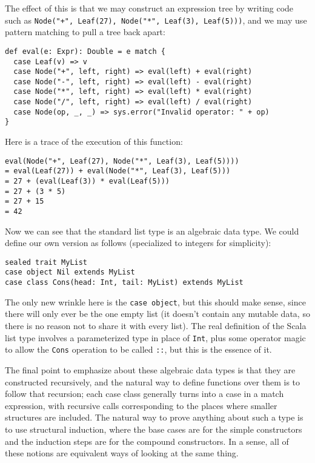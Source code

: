 The effect of this is that we may construct an expression tree by writing code such as \texttt{Node("+", Leaf(27), Node("*", Leaf(3), Leaf(5)))}, and we may use pattern matching to pull a tree back apart:
\begin{verbatim}
def eval(e: Expr): Double = e match {
  case Leaf(v) => v
  case Node("+", left, right) => eval(left) + eval(right)
  case Node("-", left, right) => eval(left) - eval(right)
  case Node("*", left, right) => eval(left) * eval(right)
  case Node("/", left, right) => eval(left) / eval(right)
  case Node(op, _, _) => sys.error("Invalid operator: " + op)
}
\end{verbatim}
Here is a trace of the execution of this function:
\begin{verbatim}
eval(Node("+", Leaf(27), Node("*", Leaf(3), Leaf(5))))
= eval(Leaf(27)) + eval(Node("*", Leaf(3), Leaf(5)))
= 27 + (eval(Leaf(3)) * eval(Leaf(5)))
= 27 + (3 * 5)
= 27 + 15
= 42
\end{verbatim}

Now we can see that the standard list type is an algebraic data type. We could define our own version as follows (specialized to integers for simplicity):
\begin{verbatim}
sealed trait MyList
case object Nil extends MyList
case class Cons(head: Int, tail: MyList) extends MyList
\end{verbatim}
The only new wrinkle here is the \texttt{case object}, but this should make sense, since there will only ever be the one empty list (it doesn't contain any mutable data, so there is no reason not to share it with every list). The real definition of the Scala list type involves a parameterized type in place of \texttt{Int}, plus some operator magic to allow the \texttt{Cons} operation to be called \texttt{::}, but this is the essence of it.

The final point to emphasize about these algebraic data types is that they are constructed recursively, and the natural way to define functions over them is to follow that recursion; each case class generally turns into a case in a match expression, with recursive calls corresponding to the places where smaller structures are included. The natural way to prove anything about such a type is to use structural induction, where the base cases are for the simple constructors and the induction steps are for the compound constructors. In a sense, all of these notions are equivalent ways of looking at the same thing.

